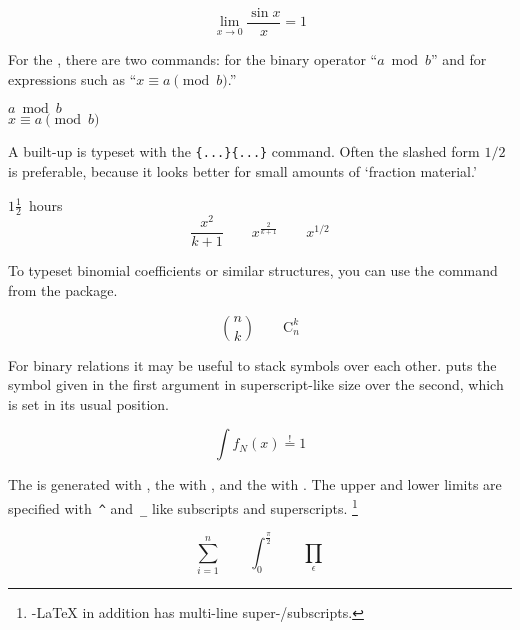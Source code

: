 \begin{example}
\[\lim_{x \rightarrow 0}
\frac{\sin x}{x}=1\]
\end{example}

For the , there are two commands:  for the
binary operator ``$a \bmod b$'' and 
for expressions
such as ``$x\equiv a \pmod{b}$.''
\begin{example}
$a\bmod b$\\
$x\equiv a \pmod{b}$
\end{example}

A built-up \textbf{} is typeset with the
\verb|{...}{...}| command.
Often the slashed form $1/2$ is preferable, because it looks better
for small amounts of `fraction material.'
\begin{example}
$1\frac{1}{2}$~hours
\begin{displaymath}
\frac{ x^{2} }{ k+1 }\qquad
x^{ \frac{2}{k+1} }\qquad
x^{ 1/2 }
\end{displaymath}
\end{example}

To typeset binomial coefficients or similar structures, you can use
the command  from the  package.

\begin{example}
\begin{displaymath}
\binom{n}{k}\qquad\mathrm{C}_n^k
\end{displaymath}
\end{example}

For binary relations it may be useful to stack symbols over each other.
 puts the symbol given
in the first argument in superscript-like size over the second, which
is set in its usual position.
\begin{example}
\begin{displaymath}
\int f_N(x) \stackrel{!}{=} 1
\end{displaymath}
\end{example}

The \textbf{} is generated with , the
\textbf{} with , and the \textbf{}
with . The upper and lower limits are specified with~\verb|^|
and~\verb|_| like subscripts and superscripts.
\footnote{\AmS-\LaTeX{} in addition has multi-line super-/subscripts.}
\begin{example}
\begin{displaymath}
\sum_{i=1}^{n} \qquad
\int_{0}^{\frac{\pi}{2}} \qquad
\prod_\epsilon
\end{displaymath}
\end{example}

